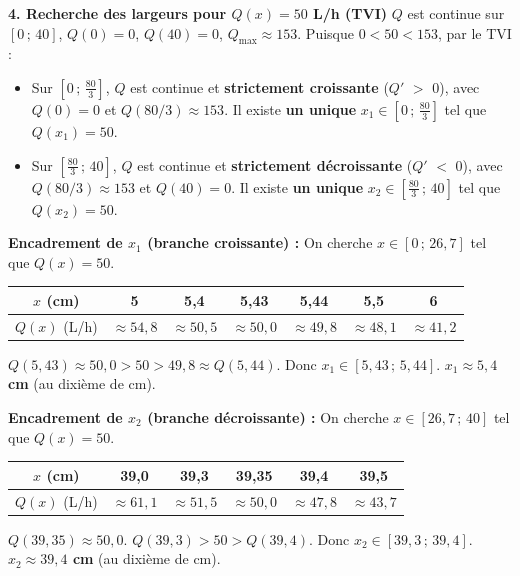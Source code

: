 \documentclass[11pt]{article}
\begin{document}
\begin{exoresolu}
\textbf{4. Recherche des largeurs pour $Q(x) = 50$ L/h (TVI)}
$Q$ est continue sur $[0\,;\, 40]$, $Q(0)=0$, $Q(40)=0$, $Q_{\text{max}} \approx 153$.
Puisque $0 < 50 < 153$, par le TVI :
\begin{itemize}
    \item Sur $\left[0\,;\, \frac{80}{3}\right]$, $Q$ est continue et \textbf{strictement croissante} ($Q'$ $>$ 0), avec $Q(0)=0$ et $Q(80/3)\approx 153$. Il existe \textbf{un unique} $x_1 \in \left[0\,;\, \frac{80}{3}\right]$ tel que $Q(x_1)=50$.
    \item Sur $\left[\frac{80}{3}\,;\, 40\right]$, $Q$ est continue et \textbf{strictement décroissante} ($Q'$ $<$ 0), avec $Q(80/3)\approx 153$ et $Q(40)=0$. Il existe \textbf{un unique} $x_2 \in \left[\frac{80}{3}\,;\, 40\right]$ tel que $Q(x_2)=50$.
\end{itemize}

\noindent \textbf{Encadrement de $x_1$ (branche croissante) :}
On cherche $x \in [0\,;\, 26,7]$ tel que $Q(x)=50$.
\begin{center}
\begin{tabular}{|c|c|c|c|c|c|c|}\hline
$x$ (cm) & 5 & 5,4 & 5,43 & 5,44 & 5,5 & 6 \\ \hline
$Q(x)$ (L/h) & $\approx 54,8$ & $\approx 50,5$ & $\approx 50,0$ & $\approx 49,8$ & $\approx 48,1$ & $\approx 41,2$ \\ \hline
\end{tabular}
\end{center}
$Q(5,43) \approx 50,0 > 50 > 49,8 \approx Q(5,44)$. Donc $x_1 \in [5,43\,;\, 5,44]$.
\textbf{$x_1 \approx 5,4$ cm} (au dixième de cm).

\noindent \textbf{Encadrement de $x_2$ (branche décroissante) :}
On cherche $x \in [26,7\,;\, 40]$ tel que $Q(x)=50$.
\begin{center}
\begin{tabular}{|c|c|c|c|c|c|}\hline
$x$ (cm) & 39,0 & 39,3 & 39,35 & 39,4 & 39,5 \\ \hline
$Q(x)$ (L/h) & $\approx 61,1$ & $\approx 51,5$ & $\approx 50,0$ & $\approx 47,8$ & $\approx 43,7$ \\ \hline
\end{tabular}
\end{center}
$Q(39,35) \approx 50,0$. $Q(39,3) > 50 > Q(39,4)$. Donc $x_2 \in [39,3\,;\, 39,4]$.
\textbf{$x_2 \approx 39,4$ cm} (au dixième de cm).


\end{exoresolu}
\end{document}
